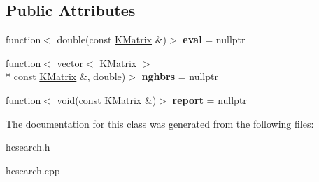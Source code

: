 \subsection*{Public Attributes}
\begin{DoxyCompactItemize}
\item 
\hypertarget{class_k_base_1_1_v_h_c_search_aa21cec8bb60f9045844cb2b227d40d6d}{function$<$ double(const \hyperlink{class_k_base_1_1_k_matrix}{K\-Matrix} \&)$>$ {\bfseries eval} = nullptr}\label{class_k_base_1_1_v_h_c_search_aa21cec8bb60f9045844cb2b227d40d6d}

\item 
\hypertarget{class_k_base_1_1_v_h_c_search_a8d380d740b3d3f1a70f7ffba84e40aa4}{function$<$ vector$<$ \hyperlink{class_k_base_1_1_k_matrix}{K\-Matrix} $>$\\*
const \hyperlink{class_k_base_1_1_k_matrix}{K\-Matrix} \&, double)$>$ {\bfseries nghbrs} = nullptr}\label{class_k_base_1_1_v_h_c_search_a8d380d740b3d3f1a70f7ffba84e40aa4}

\item 
\hypertarget{class_k_base_1_1_v_h_c_search_ac941aad6b2362e53d5dabfb8289c84ae}{function$<$ void(const \hyperlink{class_k_base_1_1_k_matrix}{K\-Matrix} \&)$>$ {\bfseries report} = nullptr}\label{class_k_base_1_1_v_h_c_search_ac941aad6b2362e53d5dabfb8289c84ae}

\end{DoxyCompactItemize}


The documentation for this class was generated from the following files\-:\begin{DoxyCompactItemize}
\item 
hcsearch.\-h\item 
hcsearch.\-cpp\end{DoxyCompactItemize}
